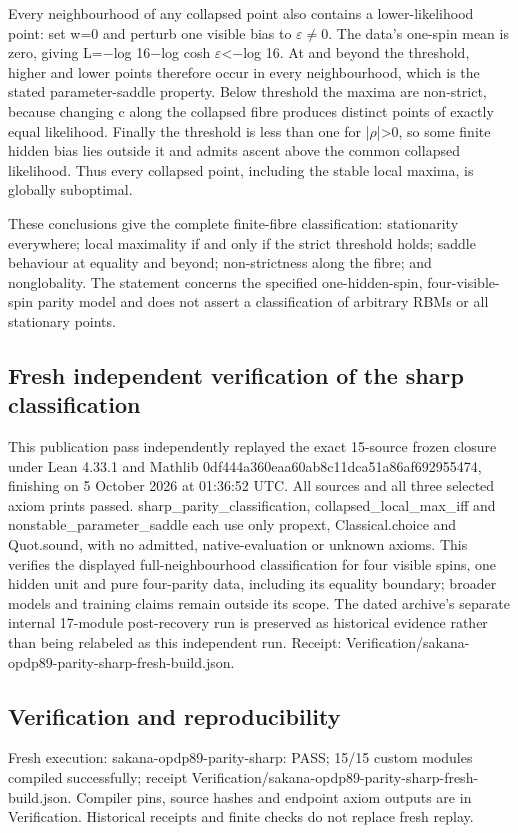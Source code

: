 \documentclass[11pt,a4paper]{article}
\begin{document}
Every neighbourhood of any collapsed point also contains a lower-likelihood point: set w=0 and perturb one visible bias to \ensuremath{\varepsilon}\ensuremath{\neq}0. The data's one-spin mean is zero, giving L=\ensuremath{-}log 16\ensuremath{-}log cosh \ensuremath{\varepsilon}<\ensuremath{-}log 16. At and beyond the threshold, higher and lower points therefore occur in every neighbourhood, which is the stated parameter-saddle property. Below threshold the maxima are non-strict, because changing c along the collapsed fibre produces distinct points of exactly equal likelihood. Finally the threshold is less than one for |\ensuremath{\rho}|>0, so some finite hidden bias lies outside it and admits ascent above the common collapsed likelihood. Thus every collapsed point, including the stable local maxima, is globally suboptimal.

These conclusions give the complete finite-fibre classification: stationarity everywhere; local maximality if and only if the strict threshold holds; saddle behaviour at equality and beyond; non-strictness along the fibre; and nonglobality. The statement concerns the specified one-hidden-spin, four-visible-spin parity model and does not assert a classification of arbitrary RBMs or all stationary points.

\subsection{Fresh independent verification of the sharp classification}
This publication pass independently replayed the exact 15-source frozen closure under Lean 4.33.1 and Mathlib 0df444a360eaa60ab8c11dca51a86af692955474, finishing on 5 October 2026 at 01:36:52 UTC. All sources and all three selected axiom prints passed. sharp\_parity\_classification, collapsed\_local\_max\_iff and nonstable\_parameter\_saddle each use only propext, Classical.choice and Quot.sound, with no admitted, native-evaluation or unknown axioms. This verifies the displayed full-neighbourhood classification for four visible spins, one hidden unit and pure four-parity data, including its equality boundary; broader models and training claims remain outside its scope. The dated archive's separate internal 17-module post-recovery run is preserved as historical evidence rather than being relabeled as this independent run. Receipt: Verification/sakana-opdp89-parity-sharp-fresh-build.json.

\subsection{Verification and reproducibility}
Fresh execution: sakana-opdp89-parity-sharp: PASS; 15/15 custom modules compiled successfully; receipt Verification/sakana-opdp89-parity-sharp-fresh-build.json. Compiler pins, source hashes and endpoint axiom outputs are in Verification. Historical receipts and finite checks do not replace fresh replay.
\end{document}
